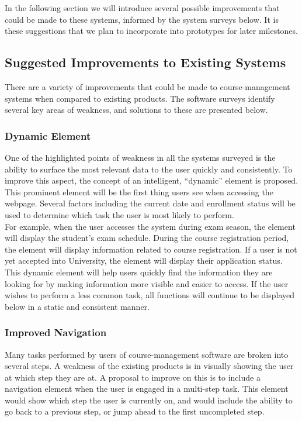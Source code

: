 \documentclass[10pt]{article}
\begin{document}
\begin{multicols}{2}
In the following section we will introduce several possible improvements that 
could be made to these systems, informed by the system surveys below. It is 
these suggestions that we plan to incorporate into prototypes for later 
milestones.

\subsection*{Suggested Improvements to Existing Systems}
There are a variety of improvements that could be made to course-management 
systems when compared to existing products. The software surveys identify 
several key areas of weakness, and solutions to these are presented below.

\subsubsection*{Dynamic Element}
One of the highlighted points of weakness in all the systems surveyed is the 
ability to surface the most relevant data to the user quickly and consistently. 
To improve this aspect, the concept of an intelligent, ``dynamic'' element is 
proposed. This prominent element will be the first thing users see when 
accessing the webpage. Several factors including the current date and enrollment 
status will be used to determine which task the user is most likely to perform.
\\

For example, when the user accesses the system during exam season, the element 
will display the student's exam schedule. During the course registration period, 
the element will display information related to course registration. If a user 
is not yet accepted into University, the element will display their application 
status.\\

This dynamic element will help users quickly find the information they are 
looking for by making information more visible and easier to access. If the user 
wishes to perform a less common task, all functions will continue to be 
displayed below in a static and consistent manner.

\subsubsection*{Improved Navigation}
Many tasks performed by users of course-management software are broken into 
several steps. A weakness of the existing products is in visually showing the 
user at which step they are at. A proposal to improve on this is to include a 
navigation element when the user is engaged in a multi-step task. This element 
would show which step the user is currently on, and would include the ability to 
go back to a previous step, or jump ahead to the first uncompleted step.\\


\end{multicols}
\end{document}
